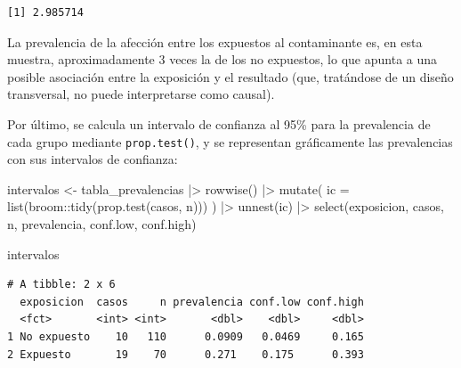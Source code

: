 \documentclass[
  spanish,
  a4paper,
]{scrreport}
\newenvironment{Shaded}{\begin{snugshade}}{\end{snugshade}}
\newcommand{\AttributeTok}[1]{\textcolor[rgb]{0.40,0.45,0.13}{#1}}
\newcommand{\FunctionTok}[1]{\textcolor[rgb]{0.28,0.35,0.67}{#1}}
\newcommand{\NormalTok}[1]{\textcolor[rgb]{0.00,0.23,0.31}{#1}}
\newcommand{\OtherTok}[1]{\textcolor[rgb]{0.00,0.23,0.31}{#1}}
\newcommand{\SpecialCharTok}[1]{\textcolor[rgb]{0.37,0.37,0.37}{#1}}
\theoremstyle{definition}
\theoremstyle{definition}
\theoremstyle{remark}
\begin{document}
\begin{verbatim}
[1] 2.985714
\end{verbatim}

La prevalencia de la afección entre los expuestos al contaminante es, en
esta muestra, aproximadamente 3 veces la de los no expuestos, lo que
apunta a una posible asociación entre la exposición y el resultado (que,
tratándose de un diseño transversal, no puede interpretarse como
causal).

Por último, se calcula un intervalo de confianza al 95\% para la
prevalencia de cada grupo mediante \texttt{prop.test()}, y se
representan gráficamente las prevalencias con sus intervalos de
confianza:

\begin{Shaded}
\begin{Highlighting}[]
\NormalTok{intervalos }\OtherTok{\textless{}{-}}\NormalTok{ tabla\_prevalencias }\SpecialCharTok{|\textgreater{}}
  \FunctionTok{rowwise}\NormalTok{() }\SpecialCharTok{|\textgreater{}}
  \FunctionTok{mutate}\NormalTok{(}
    \AttributeTok{ic =} \FunctionTok{list}\NormalTok{(broom}\SpecialCharTok{::}\FunctionTok{tidy}\NormalTok{(}\FunctionTok{prop.test}\NormalTok{(casos, n)))}
\NormalTok{  ) }\SpecialCharTok{|\textgreater{}}
  \FunctionTok{unnest}\NormalTok{(ic) }\SpecialCharTok{|\textgreater{}}
  \FunctionTok{select}\NormalTok{(exposicion, casos, n, prevalencia, conf.low, conf.high)}

\NormalTok{intervalos}
\end{Highlighting}
\end{Shaded}

\begin{verbatim}
# A tibble: 2 x 6
  exposicion  casos     n prevalencia conf.low conf.high
  <fct>       <int> <int>       <dbl>    <dbl>     <dbl>
1 No expuesto    10   110      0.0909   0.0469     0.165
2 Expuesto       19    70      0.271    0.175      0.393
\end{verbatim}
\end{document}
